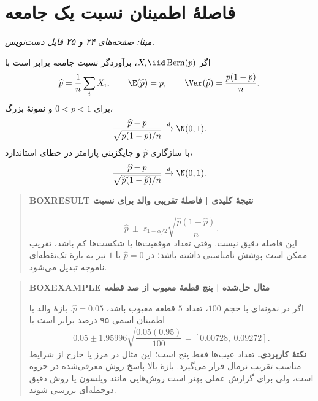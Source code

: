 \section{فاصلهٔ اطمینان نسبت یک جامعه}
\textit{مبنا: صفحه‌های ۲۴ و ۲۵ فایل دست‌نویس.}\par 
اگر $X_i\iid\operatorname{Bern}(p)$، برآوردگر نسبت جامعه برابر است با
\[
\widehat p=\frac1n\sum_iX_i,\qquad
\E(\widehat p)=p,\qquad \Var(\widehat p)=\frac{p(1-p)}n.
\]
برای $0<p<1$ و نمونهٔ بزرگ،
\[
\frac{\widehat p-p}{\sqrt{p(1-p)/n}}\xrightarrow{d}\N(0,1).
\]
با سازگاری $\widehat p$ و جایگزینی پارامتر در خطای استاندارد،
\[
\frac{\widehat p-p}{\sqrt{\widehat p(1-\widehat p)/n}}
\xrightarrow{d}\N(0,1).
\]
\begin{quote}\textbf{BOXRESULT نتیجهٔ کلیدی | فاصلهٔ تقریبی والد برای نسبت}\par 
\[
\boxed{\widehat p\ \pm\ z_{1-\alpha/2}
\sqrt{\frac{\widehat p(1-\widehat p)}n}.}
\]
این فاصله دقیق نیست. وقتی تعداد موفقیت‌ها یا شکست‌ها کم باشد، تقریب ممکن است پوشش نامناسبی داشته باشد؛ در $\widehat p=0$ یا $1$ نیز به بازهٔ تک‌نقطه‌ای ناموجه تبدیل می‌شود.
\end{quote}
\begin{quote}\textbf{BOXEXAMPLE مثال حل‌شده | پنج قطعهٔ معیوب از صد قطعه}\par 
اگر در نمونه‌ای با حجم $100$، تعداد $5$ قطعه معیوب باشد، $\widehat p=0.05$. بازهٔ والد با اطمینان اسمی ۹۵ درصد برابر است با
\[
0.05\pm1.95996\sqrt{\frac{0.05(0.95)}{100}}
=\boxed{[0.00728,\ 0.09272]}.
\]
\textbf{نکتهٔ کاربردی.} تعداد عیب‌ها فقط پنج است؛ این مثال در مرز یا خارج از شرایط مناسب تقریب نرمال قرار می‌گیرد. بازهٔ بالا پاسخ روش معرفی‌شده در جزوه است، ولی برای گزارش عملی بهتر است روش‌هایی مانند ویلسون یا روش دقیق دوجمله‌ای بررسی شوند.
\end{quote}
